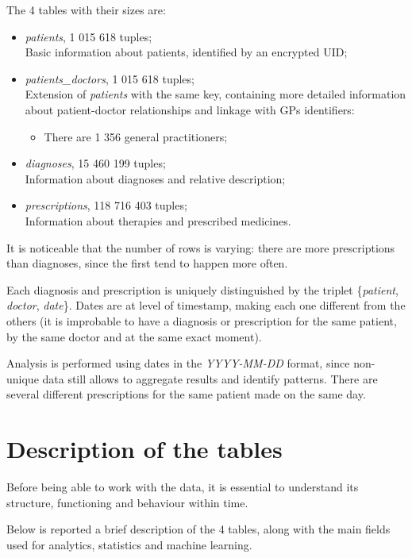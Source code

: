 The 4 tables with their sizes are:
\begin{itemize}
	\item \textit{patients}, 1 015 618 tuples; \\
	Basic information about patients, identified by an encrypted UID;
	\item \textit{patients\_doctors}, 1 015 618 tuples; \\
	Extension of \textit{patients} with the same key, containing more detailed information about patient-doctor relationships and linkage with GPs identifiers:
	\begin{itemize}
		\item There are 1 356 general practitioners;
	\end{itemize}
	\item \textit{diagnoses}, 15 460 199 tuples; \\
	Information about diagnoses and relative description;
	\item \textit{prescriptions}, 118 716 403 tuples; \\
	Information about therapies and prescribed medicines.
\end{itemize}

It is noticeable that the number of rows is varying: there are more prescriptions than diagnoses, since the first tend to happen more often.

Each diagnosis and prescription is uniquely distinguished by the triplet \{\textit{patient}, \textit{doctor}, \textit{date}\}. Dates are at level of timestamp, making each one different from the others (it is improbable to have a diagnosis or prescription for the same patient, by the same doctor and at the same exact moment). 

Analysis is performed using dates in the \textit{YYYY-MM-DD} format, since non-unique data still allows to aggregate results and identify patterns. There are several different prescriptions for the same patient made on the same day.

\section{Description of the tables}
Before being able to work with the data, it is essential to understand its structure, functioning and behaviour within time.

Below is reported a brief description of the 4 tables, along with the main fields used for analytics, statistics and machine learning.

